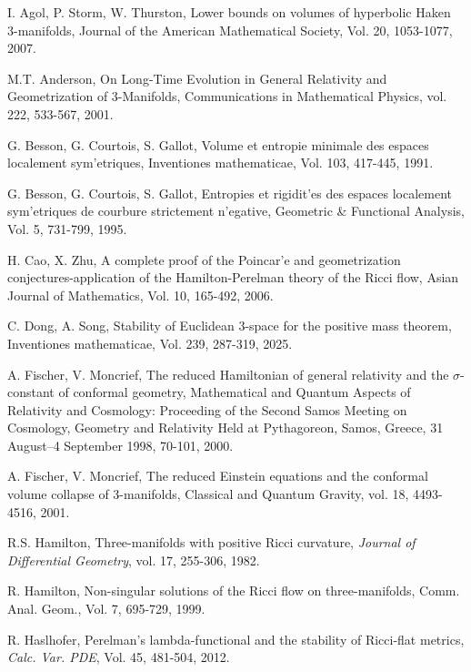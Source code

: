 \documentclass{amsart}
\begin{document}
\begin{thebibliography}{}
 I. Agol, P. Storm, W. Thurston, Lower bounds on volumes of hyperbolic Haken 3-manifolds, Journal of the American Mathematical Society, Vol. 20, 1053-1077, 2007.

 M.T. Anderson, On Long-Time Evolution in General Relativity and Geometrization of 3-Manifolds, Communications in Mathematical Physics, vol. 222, 533-567, 2001.

 G. Besson, G. Courtois, S. Gallot, Volume et entropie minimale des espaces localement sym{'e}triques, Inventiones mathematicae, Vol. 103, 417-445, 1991.

 G. Besson, G. Courtois, S. Gallot, Entropies et rigidit{'e}s des espaces localement sym{'e}triques de courbure strictement n{'e}gative, Geometric \& Functional Analysis, Vol. 5, 731-799, 1995.

 H. Cao, X. Zhu, A complete proof of the Poincar{'e} and geometrization conjectures-application of the Hamilton-Perelman theory of the Ricci flow, Asian Journal of Mathematics, Vol. 10, 165-492, 2006.

 C. Dong, A. Song, Stability of Euclidean 3-space for the positive mass theorem, Inventiones mathematicae, Vol. 239, 287-319, 2025.

 A. Fischer, V. Moncrief, The reduced Hamiltonian of general relativity and the $\sigma$-constant of conformal geometry, Mathematical and Quantum Aspects of Relativity and Cosmology: Proceeding of the Second Samos Meeting on Cosmology, Geometry and Relativity Held at Pythagoreon, Samos, Greece, 31 August--4 September 1998, 70-101, 2000.

 A. Fischer, V. Moncrief, The reduced Einstein equations and the conformal volume collapse of 3-manifolds, Classical and Quantum Gravity, vol. 18, 4493-4516, 2001.

 R.S. Hamilton, Three-manifolds with positive Ricci curvature, \textit{Journal of Differential Geometry}, vol. 17, 255-306, 1982.

 R. Hamilton, Non-singular solutions of the Ricci flow on three-manifolds, Comm. Anal. Geom., Vol. 7, 695-729, 1999.

 R. Haslhofer, Perelman’s lambda-functional and the stability of Ricci-flat metrics, \textit{Calc. Var. PDE}, Vol. 45, 481-504, 2012.




\end{thebibliography}
\end{document}
